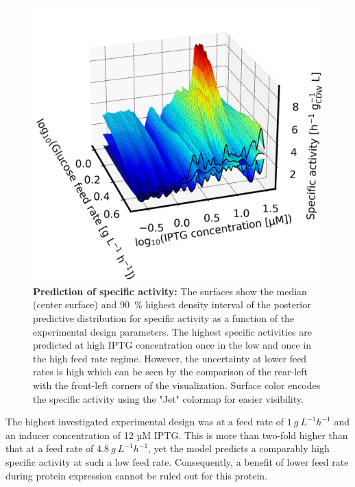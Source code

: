 \documentclass[sn-standardnature]{sn-jnl}%
\theoremstyle{thmstyleone}%
\theoremstyle{thmstyletwo}%
\theoremstyle{thmstylethree}%
\begin{document}
\begin{figure}[H]
    \centering
    \includegraphics[width=1.0\textwidth]{figures/Fig10.png}
    \caption{
        \textbf{Prediction of specific activity:}
        The surfaces show the median (center surface) and 90~\% highest density interval of the posterior predictive distribution for specific activity as a function of the experimental design parameters.
        The highest specific activities are predicted at high IPTG concentration once in the low and once in the high feed rate regime.
        However, the uncertainty at lower feed rates is high which can be seen by the comparison of the rear-left with the front-left corners of the visualization.
        Surface color encodes the specific activity using the "Jet" colormap \cite{matplotlibDocs} for easier visibility.
    }
    \label{fig_3Dsdesign}
\end{figure}


The highest investigated experimental design was at a feed rate of $1\ g\ L^{-1} h^{-1}$ and an inducer concentration of 12 µM IPTG.
This is more than two-fold higher than that at a feed rate of $4.8\ g\ L^{-1} h^{-1}$, yet the model predicts a comparably high specific activity at such a low feed rate.
Consequently, a benefit of lower feed rate during protein expression cannot be ruled out for this protein.
\end{document}
